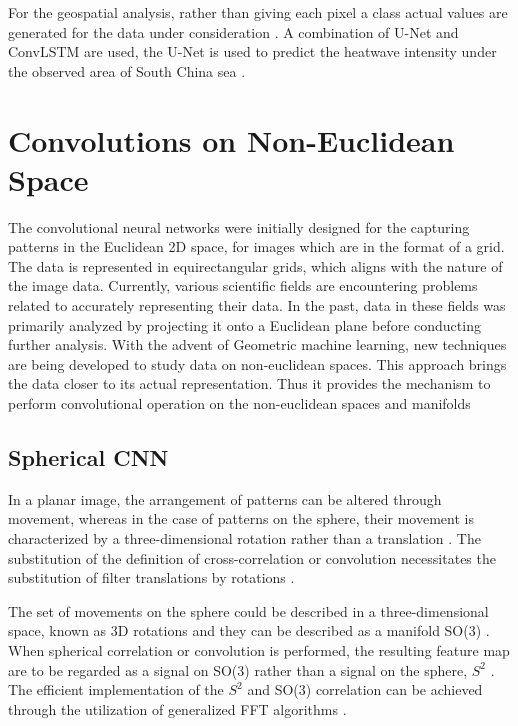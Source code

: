 For the geospatial analysis, rather than giving each pixel a class actual values are generated for the data under consideration \cite{trebing2021smaatunet}. A combination of U-Net and ConvLSTM are used, the U-Net is used to predict the heatwave intensity under the observed area of South China sea \cite{rs15164068}.

\section{Convolutions on Non-Euclidean Space}
The convolutional neural networks were initially designed for the capturing patterns in the Euclidean 2D space, for images which are in the format of a grid. The data is represented in equirectangular grids, which aligns with the nature of the image data.
Currently, various scientific fields are encountering problems related to accurately representing their data. In the past, data in these fields was primarily analyzed by projecting it onto a Euclidean plane before conducting further analysis.
With the advent of Geometric machine learning, new techniques are being developed to study data on non-euclidean spaces. This approach brings the data closer to its actual representation.
Thus it provides the mechanism to perform convolutional operation on the non-euclidean spaces and manifolds

\subsection{Spherical CNN}

In a planar image, the arrangement of patterns can be altered through movement, whereas in the case of patterns on the sphere, their movement is characterized by a three-dimensional rotation rather than a translation \cite{cohen2018spherical}.
The substitution of the definition of cross-correlation or convolution necessitates the substitution of filter translations by rotations \cite{cohen2018spherical}.

The set of movements on the sphere could be described in a three-dimensional space, known as 3D rotations and they can be described as a manifold SO(3) \cite{cohen2018spherical}. When spherical correlation or convolution is performed, the resulting feature map are to be regarded as a signal on SO(3) rather than a signal on the sphere, $S^2$ \cite{cohen2018spherical}.
The efficient implementation of the $S^2$ and SO(3) correlation can be achieved through the utilization of generalized FFT algorithms \cite{cohen2018spherical}.

